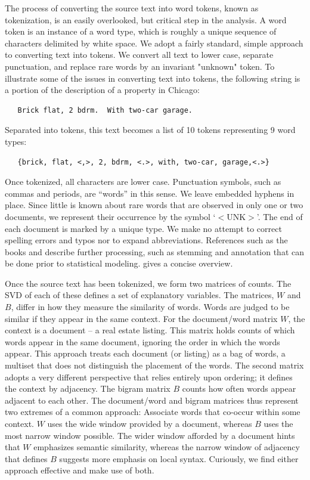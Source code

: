 \documentclass[12pt]{article}
\begin{document}
 The process of converting the source text into word tokens, known as
 tokenization, is an easily overlooked, but critical step in the analysis.  A
 word token is an instance of a word type, which is roughly a unique sequence of characters delimited by white space.  We adopt a fairly standard, simple approach to converting text into tokens.  We convert all text to lower case, separate punctuation, and replace rare words by an invariant "unknown" token.   To illustrate some of the issues in converting text into tokens, the following string is a portion of the description of a property in Chicago:
 \begin{verbatim}
   Brick flat, 2 bdrm.  With two-car garage. \end{verbatim} 
 \noindent
 Separated into tokens, this text becomes a list of 10 tokens representing 9
 word types:
 \begin{verbatim}
   {brick, flat, <,>, 2, bdrm, <.>, with, two-car, garage,<.>} \end{verbatim} 
 \noindent
 Once tokenized, all characters are lower case.  Punctuation
 symbols, such as commas and periods, are ``words'' in this sense. We leave embedded hyphens in place.  Since little
 is known about rare words that are observed in only one or two documents, we
 represent their occurrence by the symbol `$<$UNK$>$'.  The end of each document is marked by a unique type.  We make no attempt to correct spelling errors and typos nor to expand abbreviations. References such as the books \citet{manning99} and \citet{jurafsky09} describe further processing, such as stemming and annotation that can be done prior to statistical modeling. \citet{turney10} gives a concise overview.
 

Once the source text has been tokenized, we form two matrices of counts.  The SVD of each of these defines a set of explanatory variables.  The matrices, $W$ and $B$,  differ in how they measure the similarity of words. Words are judged to be similar if they appear in the same context.  For the document/word matrix $W$, the context is a document -- a real estate listing.  This matrix holds counts of which words appear in the same document, ignoring the order in which the words appear. This approach treats each document (or listing) as a bag of words, a multiset that does not distinguish the placement of the words.  The second matrix adopts a very different perspective that relies entirely upon ordering; it defines the context by adjacency.  The bigram matrix $B$ counts how often words  appear adjacent to each other.  The document/word and bigram matrices thus represent two extremes of a common approach:  Associate words that co-occur within some context.  $W$ uses the wide window provided by a document, whereas $B$ uses the most narrow window possible. The wider window afforded by a document hints that $W$ emphasizes semantic similarity, whereas the narrow window of adjacency that defines $B$ suggests more emphasis on local syntax.  Curiously, we find either approach effective and make use of both.
 
\end{document}
